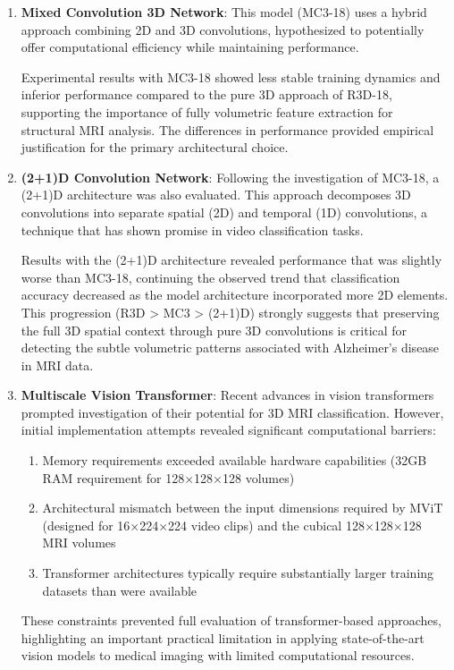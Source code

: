 \documentclass[12pt, a4paper]{article}
\begin{document}
\begin{enumerate}
    \item \textbf{Mixed Convolution 3D Network}: This model (MC3-18) uses a hybrid approach combining 2D and 3D convolutions, hypothesized to potentially offer computational efficiency while maintaining performance.
      
      Experimental results with MC3-18 showed less stable training dynamics and inferior performance compared to the pure 3D approach of R3D-18, supporting the importance of fully volumetric feature extraction for structural MRI analysis. The differences in performance provided empirical justification for the primary architectural choice.

    \item \textbf{(2+1)D Convolution Network}: Following the investigation of MC3-18, a (2+1)D architecture was also evaluated. This approach decomposes 3D convolutions into separate spatial (2D) and temporal (1D) convolutions, a technique that has shown promise in video classification tasks.
      
      Results with the (2+1)D architecture revealed performance that was slightly worse than MC3-18, continuing the observed trend that classification accuracy decreased as the model architecture incorporated more 2D elements. This progression (R3D > MC3 > (2+1)D) strongly suggests that preserving the full 3D spatial context through pure 3D convolutions is critical for detecting the subtle volumetric patterns associated with Alzheimer's disease in MRI data.
      
    \item \textbf{Multiscale Vision Transformer}: Recent advances in vision transformers prompted investigation of their potential for 3D MRI classification. However, initial implementation attempts revealed significant computational barriers:
      
      \begin{enumerate}
        \item Memory requirements exceeded available hardware capabilities (32GB RAM requirement for 128×128×128 volumes)
        \item Architectural mismatch between the input dimensions required by MViT (designed for 16×224×224 video clips) and the cubical 128×128×128 MRI volumes
        \item Transformer architectures typically require substantially larger training datasets than were available
      \end{enumerate}
      
      These constraints prevented full evaluation of transformer-based approaches, highlighting an important practical limitation in applying state-of-the-art vision models to medical imaging with limited computational resources.
\end{enumerate}
\end{document}
